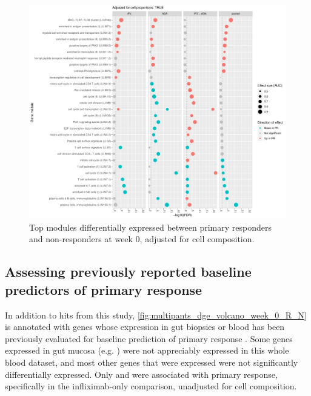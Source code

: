 \begin{figure}
    \centering
    \includegraphics[width=1.0\textwidth,page=1]{mainmatter/figures/chapter_04/plot_gene_set_enrichment.tmodCERNO_panelplot_reversed_C_1RI_1NI,C_1RA_1NA,C_(1RI_1NI)_(1RA_1NA),C_1R_1N.cell_prop_correction_TRUE.pdf}
    \caption{Top modules differentially expressed between primary responders and non-responders at week 0, adjusted for cell composition.}
    \label{fig:multipants_dge_panelPlot_week_0_R_N_cellPropT}
\end{figure}

\subsection{Assessing previously reported baseline predictors of primary response}

In addition to hits from this study, \autoref{fig:multipants_dge_volcano_week_0_R_N} is annotated with genes whose expression in gut biopsies or blood has been previously evaluated for baseline prediction of primary response \autocite{arijs2009MucosalGeneSignatures,arijs2010PredictiveValueEpithelial,verstockt2019LowTREM1Expression,salvador-martin2020GeneSignaturesEarly}.
Some genes expressed in gut mucosa (e.g. ) were not appreciably expressed in this whole blood dataset, 
and most other genes that were expressed were not significantly differentially expressed.
Only  and  were associated with primary response, specifically in the infliximab-only comparison, unadjusted for cell composition.

